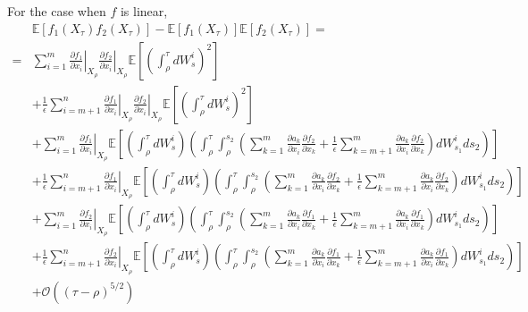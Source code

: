 \documentclass[12pt]{article}
\begin{document}
For the case when $f$ is linear,
\begin{equation}
\begin{aligned}
& \mathbb{E} [f_1(X_\tau) f_2(X_\tau) ] - \mathbb{E}[f_1(X_\tau)]\mathbb{E}[f_2(X_\tau)]= \\
=  &  \sum_{i=1}^m  \left. \frac{\partial f_1}{\partial x_i} \right|_{X_\rho} \left. \frac{\partial f_2}{\partial x_i} \right|_{X_\rho}  \mathbb{E} \left[ \left(\int_\rho^\tau dW_s^i \right)^2  \right] \\
& + \frac{1}{\epsilon} \sum_{i=m+1}^n  \left. \frac{\partial f_1}{\partial x_i} \right|_{X_\rho} \left. \frac{\partial f_2}{\partial x_i} \right|_{X_\rho}  \mathbb{E} \left[ \left(\int_\rho^\tau dW_s^i \right)^2  \right] \\
 & + \sum_{i=1}^m \left. \frac{\partial f_1}{\partial x_i} \right|_{X_\rho}  \mathbb{E} \left[ \left(\int_\rho^\tau dW_s^i \right)  \left(\int_\rho^\tau \int_{\rho}^{s_2} \left(  \sum_{k=1}^m \frac{\partial a_k}{\partial x_i} \frac{\partial f_2}{\partial x_k}  + \frac{1}{\epsilon} \sum_{k=m+1}^m \frac{\partial a_k }{\partial x_i} \frac{\partial f_2}{\partial x_k} \right)  dW_{s_1}^i ds_2 \right) \right] \\ 
 & + \frac{1}{\epsilon} \sum_{i=m+1}^n \left. \frac{\partial f_1}{\partial x_i} \right|_{X_\rho}  \mathbb{E} \left[ \left(\int_\rho^\tau dW_s^i \right)  \left(\int_\rho^\tau \int_{\rho}^{s_2} \left(  \sum_{k=1}^m \frac{\partial a_k}{\partial x_i} \frac{\partial f_2}{\partial x_k}  + \frac{1}{\epsilon} \sum_{k=m+1}^m \frac{\partial a_k }{\partial x_i} \frac{\partial f_2}{\partial x_k} \right)  dW_{s_1}^i ds_2 \right) \right] \\ 
 & + \sum_{i=1}^m  \left. \frac{\partial f_2}{\partial x_i} \right|_{X_\rho}  \mathbb{E} \left[ \left(\int_\rho^\tau dW_s^i \right)  \left(\int_\rho^\tau \int_{\rho}^{s_2} \left(  \sum_{k=1}^m \frac{\partial a_k}{\partial x_i} \frac{\partial f_1}{\partial x_k}  + \frac{1}{\epsilon} \sum_{k=m+1}^m \frac{\partial a_k }{\partial x_i} \frac{\partial f_1}{\partial x_k} \right) dW_{s_1}^i ds_2 \right) \right] \\
& + \frac{1}{\epsilon} \sum_{i=m+1}^n  \left. \frac{\partial f_2}{\partial x_i} \right|_{X_\rho}  \mathbb{E} \left[ \left(\int_\rho^\tau dW_s^i \right)  \left(\int_\rho^\tau \int_{\rho}^{s_2} \left(  \sum_{k=1}^m \frac{\partial a_k}{\partial x_i} \frac{\partial f_1}{\partial x_k}  + \frac{1}{\epsilon} \sum_{k=m+1}^m \frac{\partial a_k }{\partial x_i} \frac{\partial f_1}{\partial x_k} \right) dW_{s_1}^i ds_2 \right) \right] \\
& + \mathcal{O} ((\tau - \rho)^{5/2})
 \end{aligned}
\end{equation}
\end{document}
